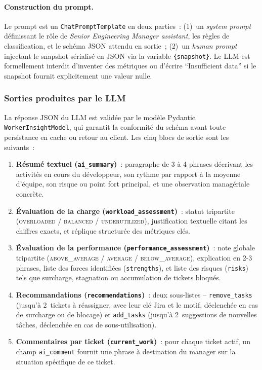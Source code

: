 \paragraph{Construction du prompt.} Le prompt est un \texttt{ChatPromptTemplate} en deux parties~: (1)~un \emph{system prompt} définissant le rôle de \emph{Senior Engineering Manager assistant}, les règles de classification, et le schéma JSON attendu en sortie~; (2)~un \emph{human prompt} injectant le snapshot sérialisé en JSON via la variable \texttt{\{snapshot\}}. Le LLM est formellement interdit d'inventer des métriques ou d'écrire ``Insufficient data'' si le snapshot fournit explicitement une valeur nulle.

\subsubsection*{Sorties produites par le LLM}

La réponse JSON du LLM est validée par le modèle Pydantic \texttt{WorkerInsightModel}, qui garantit la conformité du schéma avant toute persistance en cache ou retour au client. Les cinq blocs de sortie sont les suivants~:

\begin{enumerate}
    \item \textbf{Résumé textuel (\texttt{ai\_summary})}~: paragraphe de 3 à 4 phrases décrivant les activités en cours du développeur, son rythme par rapport à la moyenne d'équipe, son risque ou point fort principal, et une observation managériale concrète.

    \item \textbf{Évaluation de la charge (\texttt{workload\_assessment})}~: statut tripartite (\textsc{overloaded} / \textsc{balanced} / \textsc{underutilized}), justification textuelle citant les chiffres exacts, et réplique structurée des métriques clés.

    \item \textbf{Évaluation de la performance (\texttt{performance\_assessment})}~: note globale tripartite (\textsc{above\_average} / \textsc{average} / \textsc{below\_average}), explication en 2-3 phrases, liste des forces identifiées (\texttt{strengths}), et liste des risques (\texttt{risks}) tels que surcharge, stagnation ou accumulation de tickets bloqués.

    \item \textbf{Recommandations (\texttt{recommendations})}~: deux sous-listes -- \texttt{remove\_tasks} (jusqu'à 2~tickets à réassigner, avec leur clé Jira et le motif, déclenchée en cas de surcharge ou de blocage) et \texttt{add\_tasks} (jusqu'à 2~suggestions de nouvelles tâches, déclenchée en cas de sous-utilisation).

    \item \textbf{Commentaires par ticket (\texttt{current\_work})}~: pour chaque ticket actif, un champ \texttt{ai\_comment} fournit une phrase à destination du manager sur la situation spécifique de ce ticket.
\end{enumerate}

